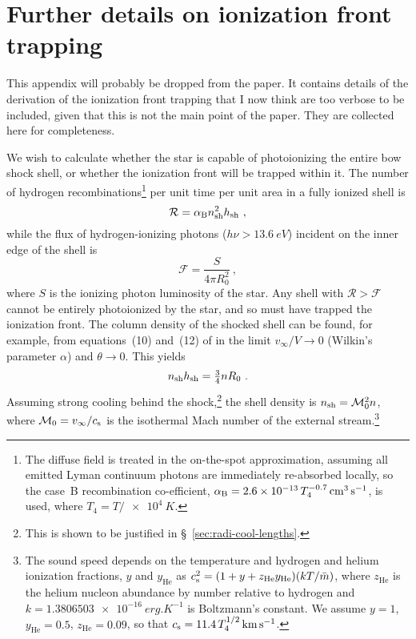 
\section{Further details on ionization front trapping}
\label{sec:furth-deta-ioniz}

This appendix will probably be dropped from the paper.  It contains
details of the derivation of the ionization front trapping that I now
think are too verbose to be included, given that this is not the main
point of the paper.  They are collected here for completeness.

We wish to calculate whether the star is capable of photoionizing the
entire bow shock shell, or whether the ionization front will be
trapped within it.  The number of hydrogen recombinations\footnote{%
  The diffuse field is treated in the on-the-spot approximation,
  assuming all emitted Lyman continuum photons are immediately
  re-absorbed locally, so the case~B recombination co-efficient,
  \(\alphaB = \num{2.6e-13}\, T_4^{-0.7}\, \si{cm^3.s^{-1}}\), is
  used, where \(T_4 = T/\SI{e4}{K}\).} %
per unit time per unit area in a fully ionized shell is
\begin{equation}
  \label{eq:shell-recombination-rate}
  \mathcal{R} = \alphaB n\shell^2 h\shell \ ,
\end{equation}
while the flux of hydrogen-ionizing photons
(\(h \nu > \SI{13.6}{eV}\)) incident on the inner edge of the shell is
\begin{equation}
  \label{eq:shell-ionizing-flux}
  \mathcal{F} = \frac{S} {4 \pi R_0^2} \ , 
\end{equation}
where \(S\) is the ionizing photon luminosity of the star.  Any shell
with \(\mathcal{R} > \mathcal{F}\) cannot be entirely photoionized by
the star, and so must have trapped the ionization front.  The column
density of the shocked shell can be found, for example, from
equations~(10) and~(12) of \citet{Wilkin:1996a} in the limit
\(v_\infty/V \to 0\) (Wilkin's parameter \(\alpha\)) and \(\theta \to 0\).  This yields
\begin{equation}
  \label{eq:shocked-shell-column}
  n\shell h\shell = \tfrac34 n R_0 \ .
\end{equation}
Assuming strong cooling behind the shock,\footnote{%
  This is shown to be justified in \S~\ref{sec:radi-cool-lengths}.
} %
the shell density is \(n\shell = \mathcal{M}_0^2 n\), where
\(\mathcal{M}_0 = v_\infty / \sound\) is the isothermal Mach number of the
external stream.\footnote{%
  \label{fn:temperature-dependence}
  The sound speed depends on the temperature and hydrogen and helium
  ionization fractions, \(y\) and \(y_{\text{He}}\) as
  \(\sound^2 = (1 + y + z_{\text{He}} y_{\text{He}}) (k T /
  \bar{m})\), where \(z_{\text{He}}\) is the helium nucleon abundance
  by number relative to hydrogen and
  \(k = \SI{1.3806503e-16}{erg.K^{-1}}\) is Boltzmann's constant.  We
  assume \(y = 1\), \(y_{\text{He}} = 0.5\), \(z_{\text{He}} = 0.09\),
  so that \(\sound = \num{11.4}\, T_4^{1/2}\, \si{km.s^{-1}}\). } %
